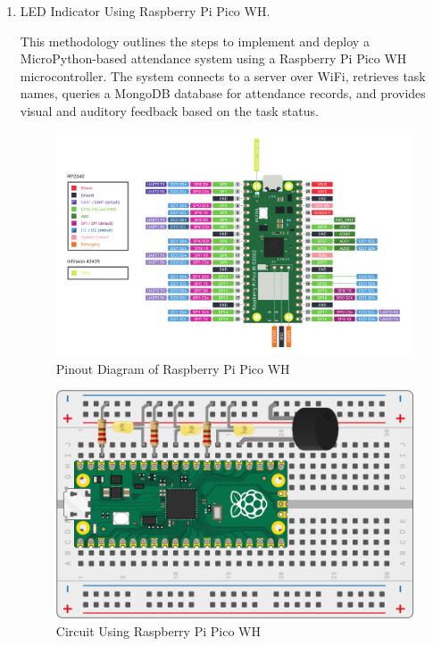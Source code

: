 \documentclass[12pt,a4paper]{report}
\begin{document}
\begin{enumerate}
		

	\item LED Indicator Using Raspberry Pi Pico WH.
		\par This methodology outlines the steps to implement and deploy a MicroPython-based attendance system using a Raspberry Pi Pico WH microcontroller. The system connects to a server over WiFi, retrieves task names, queries a MongoDB database for attendance records, and provides visual and auditory feedback based on the task status.
		\begin{figure}[H]
			\begin{center}
				\includegraphics[scale=0.5]{images/picow-pinout.png}
			\end{center}
			\caption{Pinout Diagram of Raspberry Pi Pico WH}
		\end{figure}

		\begin{figure}[H]
			\begin{center}
				\includegraphics[scale=0.35]{images/picowh-circuit.png}
			\end{center}
			\caption{Circuit Using Raspberry Pi Pico WH}
		\end{figure}


\end{enumerate}
\end{document}
